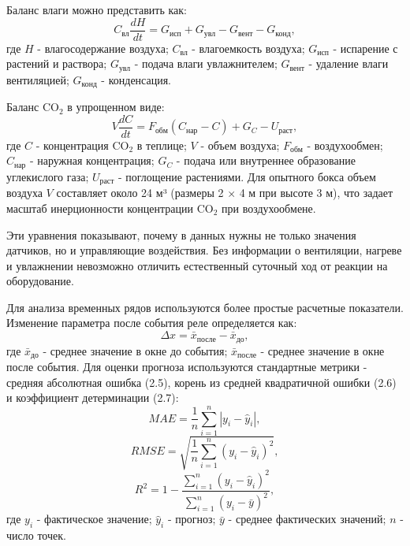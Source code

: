 \documentclass[a4paper,14pt]{extarticle}
\begin{document}
Баланс влаги можно представить как:
\begin{equation}
C_{\text{вл}} \frac{dH}{dt} = G_{\text{исп}} + G_{\text{увл}} - G_{\text{вент}} - G_{\text{конд}},
\tag{2.2}
\end{equation}
где \(H\) - влагосодержание воздуха; \(C_{\text{вл}}\) - влагоемкость
воздуха; \(G_{\text{исп}}\) - испарение с растений и раствора;
\(G_{\text{увл}}\) - подача влаги увлажнителем; \(G_{\text{вент}}\) -
удаление влаги вентиляцией; \(G_{\text{конд}}\) - конденсация.

Баланс CO\(_2\) в упрощенном виде:
\begin{equation}
V \frac{dC}{dt} = F_{\text{обм}}(C_{\text{нар}} - C) + G_C - U_{\text{раст}},
\tag{2.3}
\end{equation}
где \(C\) - концентрация CO\(_2\) в теплице; \(V\) - объем воздуха;
\(F_{\text{обм}}\) - воздухообмен; \(C_{\text{нар}}\) - наружная
концентрация; \(G_C\) - подача или внутреннее образование углекислого
газа; \(U_{\text{раст}}\) - поглощение растениями. Для опытного бокса
объем воздуха \(V\) составляет около 24 м³ (размеры 2 × 4 м при высоте 3
м), что задает масштаб инерционности концентрации CO\(_2\) при
воздухообмене.

Эти уравнения показывают, почему в данных нужны не только значения
датчиков, но и управляющие воздействия. Без информации о вентиляции,
нагреве и увлажнении невозможно отличить естественный суточный ход от
реакции на оборудование.

Для анализа временных рядов используются более простые расчетные
показатели. Изменение параметра после события реле определяется как:
\begin{equation}
\Delta x = \bar{x}_{\text{после}} - \bar{x}_{\text{до}},
\tag{2.4}
\end{equation}
где \(\bar{x}_{\text{до}}\) - среднее значение в окне до события;
\(\bar{x}_{\text{после}}\) - среднее значение в окне после события. Для
оценки прогноза используются стандартные метрики - средняя абсолютная
ошибка (2.5), корень из средней квадратичной ошибки (2.6) и коэффициент
детерминации (2.7):
\begin{equation}
MAE = \frac{1}{n}\sum_{i=1}^{n}|y_i-\hat{y}_i|,
\tag{2.5}
\end{equation}
\begin{equation}
RMSE = \sqrt{\frac{1}{n}\sum_{i=1}^{n}(y_i-\hat{y}_i)^2},
\tag{2.6}
\end{equation}
\begin{equation}
R^2 = 1 - \frac{\sum_{i=1}^{n}(y_i-\hat{y}_i)^2}{\sum_{i=1}^{n}(y_i-\bar{y})^2},
\tag{2.7}
\end{equation}
где \(y_i\) - фактическое значение; \(\hat{y}_i\) - прогноз; \(\bar{y}\)
- среднее фактических значений; \(n\) - число точек.
\end{document}
